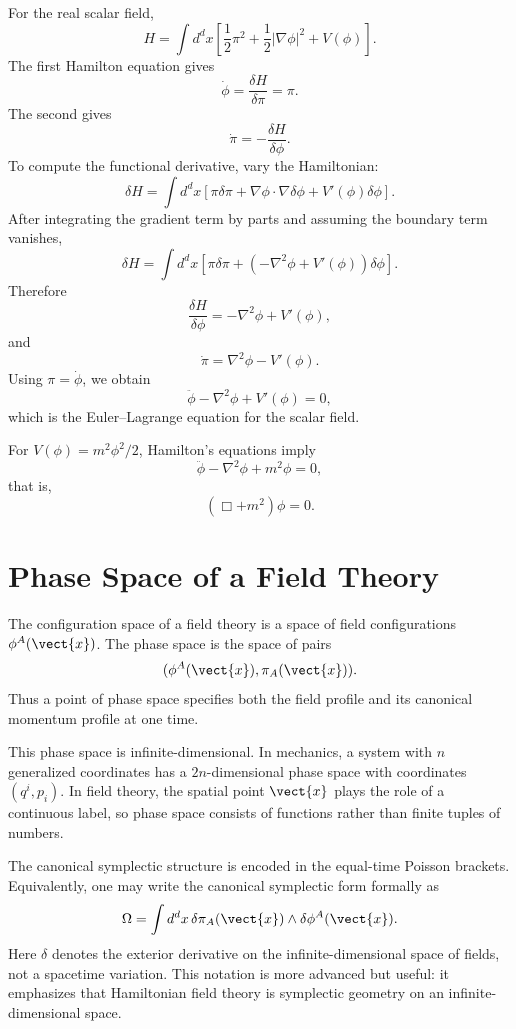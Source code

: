 For the real scalar field,
\[
    H=\int d^d x\left[
        \frac{1}{2}\pi^2
        +\frac{1}{2}|\nabla\phi|^2
        +V(\phi)
    \right].
\]
The first Hamilton equation gives
\[
    \dot\phi=\frac{\delta H}{\delta\pi}=\pi.
\]
The second gives
\[
    \dot\pi=-\frac{\delta H}{\delta\phi}.
\]
To compute the functional derivative, vary the Hamiltonian:
\[
    \delta H=\int d^d x\left[
        \pi\delta\pi+
        \nabla\phi\cdot\nabla\delta\phi+
        V'(\phi)\delta\phi
    \right].
\]
After integrating the gradient term by parts and assuming the boundary term
vanishes,
\[
    \delta H=\int d^d x\left[
        \pi\delta\pi+
        (-\nabla^2\phi+V'(\phi))\delta\phi
    \right].
\]
Therefore
\[
    \frac{\delta H}{\delta\phi}=-\nabla^2\phi+V'(\phi),
\]
and
\[
    \dot\pi=\nabla^2\phi-V'(\phi).
\]
Using \(\pi=\dot\phi\), we obtain
\[
    \ddot\phi-\nabla^2\phi+V'(\phi)=0,
\]
which is the Euler--Lagrange equation for the scalar field.

\begin{examplebox}
For \(V(\phi)=m^2\phi^2/2\), Hamilton's equations imply
\[
    \ddot\phi-\nabla^2\phi+m^2\phi=0,
\]
that is,
\[
    (\Box+m^2)\phi=0.
\]
\end{examplebox}

\section{Phase Space of a Field Theory}

The configuration space of a field theory is a space of field configurations
\(\phi^A(\vect{x})\). The phase space is the space of pairs
\[
    (\phi^A(\vect{x}),\pi_A(\vect{x})).
\]
Thus a point of phase space specifies both the field profile and its canonical
momentum profile at one time.

This phase space is infinite-dimensional. In mechanics, a system with
\(n\) generalized coordinates has a \(2n\)-dimensional phase space with
coordinates \((q^i,p_i)\). In field theory, the spatial point \(\vect{x}\) plays
the role of a continuous label, so phase space consists of functions rather than
finite tuples of numbers.

The canonical symplectic structure is encoded in the equal-time Poisson
brackets. Equivalently, one may write the canonical symplectic form formally as
\[
    \Omega=\int d^d x\,\delta\pi_A(\vect{x})\wedge\delta\phi^A(\vect{x}).
\]
Here \(\delta\) denotes the exterior derivative on the infinite-dimensional
space of fields, not a spacetime variation. This notation is more advanced but
useful: it emphasizes that Hamiltonian field theory is symplectic geometry on
an infinite-dimensional space.

